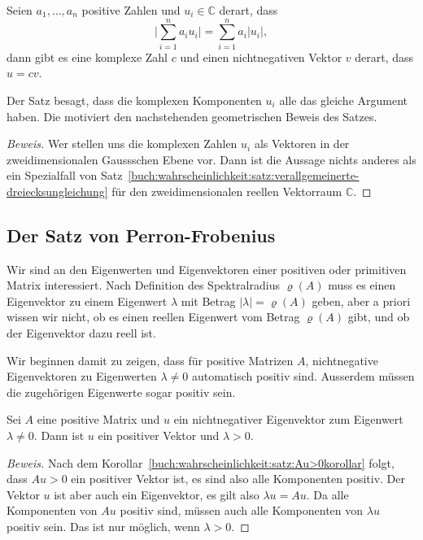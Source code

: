 \begin{satz}
Seien $a_1,\dots,a_n$ positive Zahlen und $u_i\in\mathbb C$ derart,
dass 
\[
\biggl|
\sum_{i=1}^n a_i u_i
\biggr|
=
\sum_{i=1}^n a_i |u_i|,
\]
dann gibt es eine komplexe Zahl $c$ und einen nichtnegativen Vektor $v$
derart, dass $u=cv$.
\end{satz}

Der Satz besagt, dass die komplexen Komponenten $u_i$ alle das gleiche
Argument haben.
Die motiviert den nachstehenden geometrischen Beweis des Satzes.

\begin{proof}[Beweis]
Wer stellen uns die komplexen Zahlen $u_i$ als Vektoren in der
zweidimensionalen Gaussschen Ebene vor.
Dann ist die Aussage nichts anderes als ein Spezialfall von
Satz~\ref{buch:wahrscheinlichkeit:satz:verallgemeinerte-dreiecksungleichung}
für den zweidimensionalen reellen Vektorraum $\mathbb{C}$.
\end{proof}


%
%
\subsection{Der Satz von Perron-Frobenius
\label{buch:subsection:der-satz-von-perron-frobenius}}
Wir sind an den Eigenwerten und Eigenvektoren einer positiven
oder primitiven Matrix interessiert.
Nach Definition des Spektralradius $\varrho(A)$ muss es einen Eigenvektor 
zu einem Eigenwert $\lambda$ mit Betrag $|\lambda|=\varrho(A)$ geben,
aber a priori wissen wir nicht, ob es einen reellen Eigenwert vom
Betrag $\varrho(A)$ gibt, und ob der Eigenvektor dazu reell ist.

Wir beginnen damit zu zeigen, dass für positive Matrizen $A$, 
nichtnegative Eigenvektoren zu Eigenwerten $\lambda\ne 0$
automatisch positiv sind.
Ausserdem müssen die zugehörigen Eigenwerte sogar positiv sein.

\begin{satz}
Sei $A$ eine positive Matrix und $u$ ein nichtnegativer Eigenvektor zum
Eigenwert $\lambda\ne 0$.
Dann ist $u$ ein positiver Vektor und $\lambda > 0$.
\end{satz}

\begin{proof}[Beweis]
Nach dem Korollar~\ref{buch:wahrscheinlichkeit:satz:Au>0korollar}
folgt, dass $Au>0$ ein positiver Vektor ist, es sind
also alle Komponenten positiv.
Der Vektor $u$ ist aber auch ein Eigenvektor, es gilt also
$\lambda u = Au$.
Da alle Komponenten von $Au$ positiv sind, müssen auch
alle Komponenten von $\lambda u$ positiv sein.
Das ist nur möglich, wenn $\lambda > 0$.
\end{proof}

